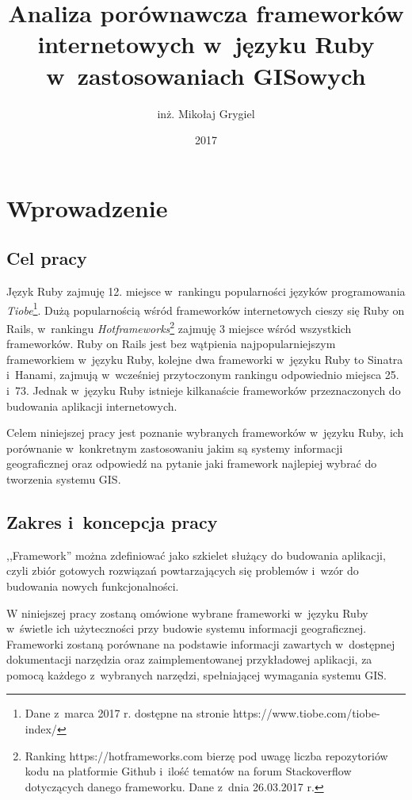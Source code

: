 \documentclass[printmode]{mgr}
\date{2017}
\title{Analiza porównawcza frameworków internetowych w~języku Ruby w~zastosowaniach GISowych}
\author{inż. Mikołaj Grygiel}
\renewcommand\lstlistlistingname{Spis fragmentów kodu}
\begin{document}


\maketitle

\tableofcontents

\listoffigures
\lstlistoflistings
{}
\addcontentsline{toc}{chapter}{\lstlistlistingname}

\chapter{Wprowadzenie}
\section{Cel pracy}
Język Ruby zajmuję 12. miejsce w~rankingu popularności języków programowania \emph{Tiobe}\footnote{Dane z~marca 2017 r. dostępne na stronie https://www.tiobe.com/tiobe-index/}. Dużą popularnością wśród frameworków internetowych cieszy się Ruby on Rails, w~rankingu \emph{Hotframeworks}\footnote{Ranking https://hotframeworks.com bierzę pod uwagę liczba repozytoriów kodu na platformie Github i~ilość tematów na forum Stackoverflow dotyczących danego frameworku. Dane z~dnia 26.03.2017 r.} zajmuję 3 miejsce wśród wszystkich frameworków. Ruby on Rails jest bez wątpienia najpopularniejszym frameworkiem w~języku Ruby, kolejne dwa frameworki w~języku Ruby to Sinatra i~Hanami, zajmują w~wcześniej przytoczonym rankingu odpowiednio miejsca 25. i~73. Jednak w~języku Ruby istnieje kilkanaście frameworków przeznaczonych do budowania aplikacji internetowych.

Celem niniejszej pracy jest poznanie wybranych frameworków w~języku Ruby, ich porównanie w~konkretnym zastosowaniu jakim są systemy informacji geograficznej oraz odpowiedź na pytanie jaki framework najlepiej wybrać do tworzenia systemu GIS.

\section{Zakres i~koncepcja pracy}
,,Framework'' można zdefiniować jako szkielet służący do budowania aplikacji, czyli zbiór gotowych rozwiązań powtarzających się problemów i~wzór do budowania nowych funkcjonalności. \cite{framework}

W niniejszej pracy zostaną omówione wybrane frameworki w~języku Ruby w~świetle ich użyteczności przy budowie systemu informacji geograficznej. Frameworki zostaną porównane na podstawie informacji zawartych w~dostępnej dokumentacji narzędzia oraz zaimplementowanej przykładowej aplikacji, za pomocą każdego z~wybranych narzędzi, spełniającej wymagania systemu GIS.
\end{document}
